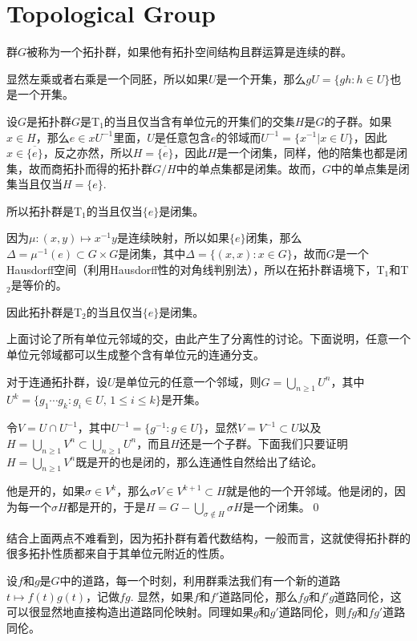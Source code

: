 \section*{Topological Group}

\para 群$G$被称为一个拓扑群，如果他有拓扑空间结构且群运算是连续的群。

\para 显然左乘或者右乘是一个同胚，所以如果$U$是一个开集，那么$gU=\{gh:h\in U\}$也是一个开集。

\para 设$G$是拓扑群$G$是T$_1$的当且仅当含有单位元的开集们的交集$H$是$G$的子群。如果$x\in H$，那么$e\in xU^{-1}$里面，$U$是任意包含$e$的邻域而$U^{-1}=\{x^{-1}|x\in U\}$，因此$x\in \overline{\{e\}}$，反之亦然，所以$H=\overline{\{e\}}$，因此$H$是一个闭集，同样，他的陪集也都是闭集，故而商拓扑而得的拓扑群$G/H$中的单点集都是闭集。故而，$G$中的单点集是闭集当且仅当$H=\{e\}$.

所以拓扑群是T$_1$的当且仅当$\{e\}$是闭集。

\para 因为$\mu:(x,y)\mapsto x^{-1}y$是连续映射，所以如果$\{e\}$闭集，那么$\Delta=\mu^{-1}(e)\subset G\times G$是闭集，其中$\Delta=\{(x,x):x\in G\}$，故而$G$是一个Hausdorff空间（利用Hausdorff性的对角线判别法），所以在拓扑群语境下，T$_1$和T$_2$是等价的。

因此拓扑群是T$_2$的当且仅当$\{e\}$是闭集。

上面讨论了所有单位元邻域的交，由此产生了分离性的讨论。下面说明，任意一个单位元邻域都可以生成整个含有单位元的连通分支。

\para 对于连通拓扑群，设$U$是单位元的任意一个邻域，则$G=\bigcup_{n\geq 1}U^n$，其中$U^k=\{g_1\cdots g_k:g_i\in U,\, 1\leq i \leq k\}$是开集。

\proof 令$V=U\cap U^{-1}$，其中$U^{-1}=\{g^{-1}:g\in U\}$，显然$V=V^{-1}\subset U$以及$H=\bigcup_{n\geq 1}V^n\subset \bigcup_{n\geq 1}U^n$，而且$H$还是一个子群。下面我们只要证明$H=\bigcup_{n\geq 1}V^n$既是开的也是闭的，那么连通性自然给出了结论。

他是开的，如果$\sigma\in V^k$，那么$\sigma V\in V^{k+1}\subset H$就是他的一个开邻域。他是闭的，因为每一个$\sigma H$都是开的，于是$H=G-\bigcup_{\sigma\notin H}\sigma H$是一个闭集。\qed

结合上面两点不难看到，因为拓扑群有着代数结构，一般而言，这就使得拓扑群的很多拓扑性质都来自于其单位元附近的性质。

\para 设$f$和$g$是$G$中的道路，每一个时刻，利用群乘法我们有一个新的道路$t\mapsto f(t)g(t)$，记做$fg$. 显然，如果$f$和$f'$道路同伦，那么$fg$和$f'g$道路同伦，这可以很显然地直接构造出道路同伦映射。同理如果$g$和$g'$道路同伦，则$fg$和$fg'$道路同伦。

